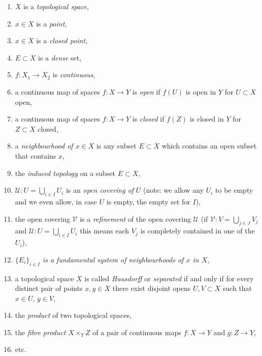 \begin{enumerate}
\item
\label{item-space}
$X$ is a {\it topological space},
\item
\label{item-point}
$x\in X$ is a {\it point},
\item
\label{item-closed-point}
$x\in X$ is a {\it closed point},
\item
\label{item-dense}
$E \subset X$ is a {\it dense} set,
\item
\label{item-continuous}
$f : X_1 \to X_2$ is {\it continuous},
\item a continuous map of spaces $f : X \to Y$ is
{\it open} if $f(U)$ is open in $Y$ for $U \subset X$ open,
\item a continuous map of spaces $f : X \to Y$ is
{\it closed} if $f(Z)$ is closed in $Y$ for $Z \subset X$ closed,
\item
\label{item-neighbourhood}
a {\it neighbourhood of $x \in X$} is any subset
$E \subset X$ which contains an open subset that
contains $x$,
\item
\label{item-induced-topology}
the {\it induced topology} on a subset $E \subset X$,
\item
\label{item-covering}
$\mathcal{U} : U = \bigcup_{i \in I} U_i$ is an
{\it open covering of} $U$ (note: we allow any $U_i$ to be empty
and we even allow, in case $U$ is empty, the empty set for $I$),
\item
\label{item-refinement}
the open covering $\mathcal{V}$ is a {\it refinement}
of the open covering $\mathcal{U}$ (if
$\mathcal{V} : V = \bigcup_{j \in J} V_j$ and
$\mathcal{U} : U = \bigcup_{i \in I} U_i$
this means each $V_j$ is completely contained in one of the $U_i$),
\item
\label{item-fundamental-system}
{\it $\{ E_i \}_{i \in I}$ is a fundamental system of neighbourhoods
of $x$ in $X$},
\item
\label{item-Hausdorff}
a topological space $X$ is called {\it Hausdorff} or {\it separated}
if and only if for every distinct pair of points $x, y \in X$ there exist
disjoint opens $U, V \subset X$ such that $x \in U$, $y \in V$,
\item the {\it product} of two topological spaces,
\label{item-product}
\item
\label{item-fibre-product}
the {\it fibre product $X \times_Y Z$} of a pair of continuous maps
$f : X \to Y$ and $g : Z \to Y$,
\item etc.
\end{enumerate}




